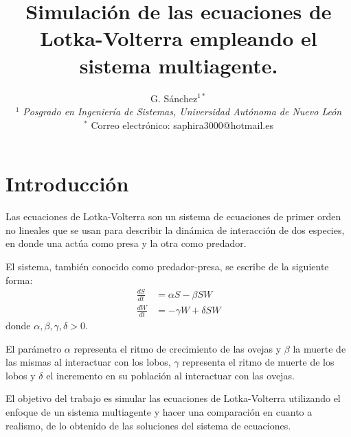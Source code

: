 \documentclass[12pt, twocolumn]{article}
\title{\bf Simulaci\'on de las ecuaciones de Lotka-Volterra empleando el sistema multiagente.}
\author{G. S\'anchez$^{1\ast}$\\
$^{1}$ {\small \textit{Posgrado en Ingenier\'ia de Sistemas, Universidad Aut\'onoma de Nuevo Le\'on}}\\ 
{\small $^\ast$ Correo electr\'onico:  saphira3000@hotmail.es}\\
}
\date{}
\begin{document}
\pagestyle{empty}



\section{Introducci\'on}
\label{sec:intro}

Las ecuaciones de Lotka-Volterra son un sistema de ecuaciones de primer orden no lineales que se usan para describir la din\'amica de interacci\'on de dos especies, en donde una act\'ua como presa y la otra como predador.

El sistema, tambi\'en conocido como predador-presa, se escribe de la siguiente forma:
\begin{equation}
\begin{split}
\frac{dS}{dt} &= \alpha S - \beta SW \\
\frac{dW}{dt} &= -\gamma W + \delta SW
\end{split}
\label{ecs lotka-volterra}
\end{equation} 
donde $\alpha, \beta, \gamma, \delta > 0$.

El par\'ametro $\alpha$ representa el ritmo de crecimiento de las ovejas y $\beta$ la muerte de las mismas al interactuar con los lobos, $\gamma$ representa el ritmo de muerte de los lobos y $\delta$ el incremento en su poblaci\'on al interactuar con las ovejas. 

El objetivo del trabajo es simular las ecuaciones de Lotka-Volterra utilizando el enfoque de un sistema multiagente y hacer una comparaci\'on en cuanto a realismo, de lo obtenido de las soluciones del sistema de ecuaciones.
\end{document}
